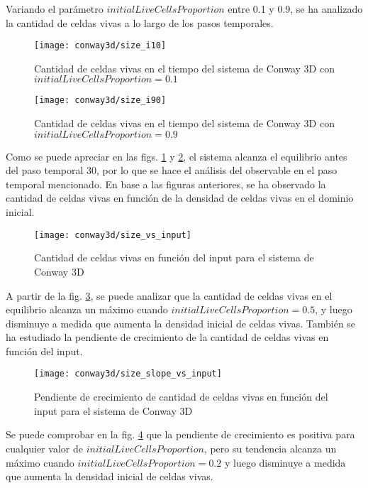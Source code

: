 Variando el parámetro $initialLiveCellsProportion$ entre 0.1 y 0.9, se ha analizado la cantidad de celdas vivas
a lo largo de los pasos temporales.

\begin{figure}[H]
    \centering
    \texttt{[image: conway3d/size\_i10]}
    \caption{Cantidad de celdas vivas en el tiempo del sistema de Conway 3D con $initialLiveCellsProportion = 0.1$}
    \label{fig:conway3d_i10}
\end{figure}
\begin{figure}[H]
    \centering
    \texttt{[image: conway3d/size\_i90]}
    \caption{Cantidad de celdas vivas en el tiempo del sistema de Conway 3D con $initialLiveCellsProportion = 0.9$}
    \label{fig:conway3d_i90}
\end{figure}

Como se puede apreciar en las figs. \ref{fig:conway3d_i10} y \ref{fig:conway3d_i90}, el sistema alcanza el equilibrio
antes del paso temporal 30, por lo que se hace el análisis del observable en el paso temporal mencionado.
En base a las figuras anteriores, se ha observado la cantidad de celdas vivas en función de la densidad de celdas
vivas en el dominio inicial.

\begin{figure}[H]
    \centering
    \texttt{[image: conway3d/size\_vs\_input]}
    \caption{Cantidad de celdas vivas en función del input para el sistema de Conway 3D}
    \label{fig:conway3d_size_vs_input}
\end{figure}

A partir de la fig. \ref{fig:conway3d_size_vs_input}, se puede analizar que la cantidad
de celdas vivas en el equilibrio alcanza un máximo cuando $initialLiveCellsProportion = 0.5$, y luego
disminuye a medida que aumenta la densidad inicial de celdas vivas.
También se ha estudiado la pendiente de crecimiento de la cantidad de celdas vivas en función del input.

\begin{figure}[H]
    \centering
    \texttt{[image: conway3d/size\_slope\_vs\_input]}
    \caption{Pendiente de crecimiento de cantidad de celdas vivas en función del input para el sistema de Conway 3D}
    \label{fig:conway3d_size_slope_vs_input}
\end{figure}

Se puede comprobar en la fig. \ref{fig:conway3d_size_slope_vs_input} que la pendiente de crecimiento es positiva
para cualquier valor de $initialLiveCellsProportion$, pero su tendencia alcanza un máximo cuando
$initialLiveCellsProportion = 0.2$ y luego disminuye a medida que aumenta la densidad inicial de celdas vivas.

